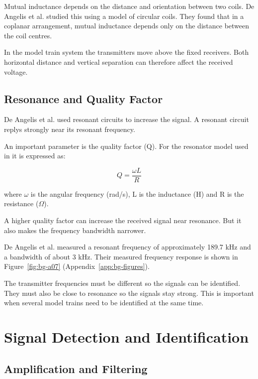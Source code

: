 Mutual inductance depends on the distance and orientation between two coils. De Angelis et al. \cite{deangelis2015indoor} studied this using 
a model of circular coils. They found that in a coplanar arrangement, mutual inductance depends only on the distance between the coil centres.

In the model train system the transmitters move above the fixed receivers. Both horizontal distance
and vertical separation can therefore affect the received voltage.





\subsection{Resonance and Quality Factor}\label{sec:bg-1-3-3}

De Angelis et al. \cite{deangelis2015indoor} used resonant circuits to increase the signal. A resonant circuit replys  strongly near its resonant frequency.

An important parameter is the quality factor (Q). For the resonator model used in \cite{deangelis2015indoor} it is expressed as:

\[
Q = \frac{\omega L}{R}
\]

where \(\omega\) is the angular frequency (rad/s), L is the inductance (H) and R is the resistance (\(\Omega\)).

A higher quality factor can increase the received signal near resonance. But it also makes the frequency bandwidth narrower.

De Angelis et al. \cite{deangelis2015indoor} measured a resonant frequency of approximately 189.7 kHz and a bandwidth of about 3 kHz. Their measured 
frequency response is shown in Figure~\ref{fig:bg-a07} (Appendix~\ref{app:bg-figures}).

The transmitter frequencies must be different so the signals can be identified. They must also be close to resonance so the signals stay strong. 
This is important when several model trains need to be identified at the same time.






\section{Signal Detection and Identification}\label{sec:bg-1-4}

\subsection{Amplification and Filtering} \label{sec:bg-1-4-1}

